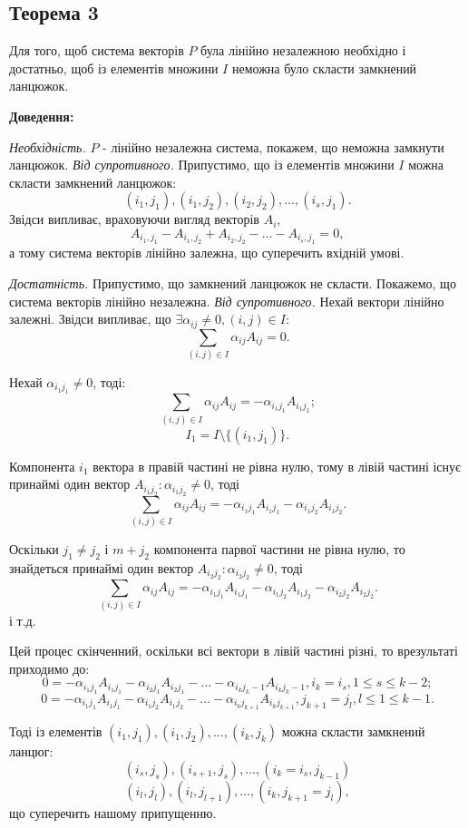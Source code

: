 \documentclass[12pt,a4paper]{book}
\begin{document}
\subsection{Теорема 3}

Для того, щоб система векторів $P$ була лінійно незалежною необхідно і достатньо, щоб із елементів множини $I$ неможна було скласти замкнений ланцюжок.

{\bf Доведення:}

{\it Необхідність.} $P$ - лінійно незалежна система, покажем, що неможна замкнути ланцюжок. {\it Від супротивного.} Припустимо, що із елементів множини $I$ можна скласти замкнений ланцюжок: $$(i_1,j_1), (i_1,j_2), (i_2,j_2), \dots, (i_s,j_1).$$ Звідси випливає, враховуючи вигляд векторів $A_i$, $$A_{{i_1},{j_1}}-A_{{i_1},{j_2}}+A_{{i_2},{j_2}}-\dots-A_{{i_s},{j_1}}=0,$$ а тому система векторів лінійно залежна, що суперечить вхідній умові.

{\it Достатність.} Припустимо, що замкнений ланцюжок не скласти. Покажемо, що система векторів лінійно незалежна. {\it Від супротивного.} Нехай вектори лінійно залежні. Звідси випливає, що $\exists \alpha_{ij} \neq 0, (i,j) \in I:$ $$\sum_{(i,j) \in I}\alpha_{ij}A_{ij} = 0.$$

Нехай $\alpha_{{i_1}{j_1}} \neq 0$, тоді: 
$$\sum_{(i,j) \in I}\alpha_{ij}A_{ij} = -\alpha_{{i_1}{j_1}}A_{{i_1}{j_1}};$$
$$I_1 = I\setminus\{(i_1,j_1)\}.$$

Компонента $i_1$ вектора в правій частині не рівна нулю, тому в лівій частині існує принаймі один вектор $A_{{i_1}{j_2}}: \alpha_{{i_1}{j_2}}\neq0$, тоді 
$$\sum_{(i,j){\in}I}\alpha_{ij}A_{ij} = -\alpha_{{i_1}{j_1}}A_{{i_1}{j_1}}-\alpha_{{i_1}{j_2}}A_{{i_1}{j_2}}.$$

Оскільки $j_1 \neq j_2$ і $m + j_2$ компонента парвої частини не рівна нулю, то знайдеться принаймі один вектор $A_{{i_2}{j_2}}: \alpha_{{i_2}{j_2}} \neq 0$, тоді $$\sum_{(i,j) \in I}\alpha_{ij}A_{ij} = -\alpha_{{i_1}{j_1}}A_{{i_1}{j_1}}-\alpha_{{i_1}{j_2}}A_{{i_1}{j_2}}-\alpha_{{i_2}{j_2}}A_{{i_2}{j_2}}.$$
і т.д.

Цей процес скінченний, оскільки всі вектори в лівій частині різні, то врезультаті приходимо до:
$$0 = -\alpha_{{i_1}{j_1}}A_{{i_1}{j_1}}-\alpha_{{i_2}{j_1}}A_{{i_2}{j_1}}-\dots-\alpha_{{i_k}{j_k-1}}A_{{i_k}{j_k-1}}, i_k=i_s, 1 \leq s \leq k-2;$$
$$0 = -\alpha_{{i_1}{j_1}}A_{{i_1}{j_1}}-\alpha_{{i_1}{j_2}}A_{{i_1}{j_2}}-\dots-\alpha_{{i_k}{j_{k+1}}}A_{{i_k}{j_{k+1}}}, j_{k+1}=j_l, l \leq 1 \leq k-1.$$

Тоді із елементів $(i_1,j_1), (i_1,j_2), \dots, (i_k,j_k)$ можна скласти замкнений ланцюг:
$$(i_s,j_s), (i_{s+1},j_s), \dots, (i_k = i_s, j_{k-1})$$
$$(i_l,j_l), (i_l,j_{l+1}), \dots, (i_k, j_{k+1} = j_l),$$
що суперечить нашому припущенню.
\end{document}
